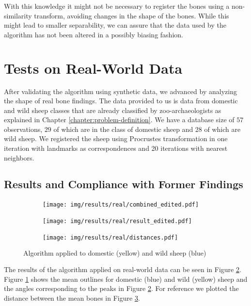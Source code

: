 \documentclass[pdftex,12pt,a4paper]{report}
\begin{document}
With this knowledge it might not be necessary to register the bones using a non-similarity transform, avoiding changes in the shape of the bones. While this might lead to smaller separability, we can assure that the data used by the algorithm has not been altered in a possibly biasing fashion.

\section{Tests on Real-World Data}

After validating the algorithm using synthetic data, we advanced by analyzing the shape of real bone findings. The data provided to us is data from domestic and wild sheep classes that are already classified by zoo-archaeologists as explained in Chapter \ref{chapter:problem-definition}. We have a database size of $57$ observations, $29$ of which are in the class of domestic sheep and $28$ of which are wild sheep. We registered the sheep using Procrustes transformation in one iteration with landmarks as correspondences and 20 iterations with nearest neighbors.

\subsection{Results and Compliance with Former Findings} 

\begin{figure}
	\centering
	\begin{subfigure}[b]{0.25\textwidth}
		\centering
		\texttt{[image: img/results/real/combined\_edited.pdf]}
		\label{fig:main-result-data}
	\end{subfigure}
	\begin{subfigure}[b]{0.35\textwidth}
		\centering
		\texttt{[image: img/results/real/result\_edited.pdf]}
		\label{fig:main-result-chart}
	\end{subfigure}
	\begin{subfigure}[b]{0.35\textwidth}
		\centering
		\texttt{[image: img/results/real/distances.pdf]}
		\label{fig:main-result-distance}
	\end{subfigure}
	\caption{Algorithm applied to domestic (yellow) and wild sheep (blue)}
	\label{fig:main-result}
\end{figure}

The results of the algorithm applied on real-world data can be seen in Figure \ref{fig:main-result-chart}. Figure \ref{fig:main-result-data} shows the mean outlines for domestic (blue) and wild (yellow) sheep and the angles corresponding to the peaks in Figure \ref{fig:main-result-chart}. For reference we plotted the distance between the mean bones in Figure \ref{fig:main-result-distance}.
\end{document}
